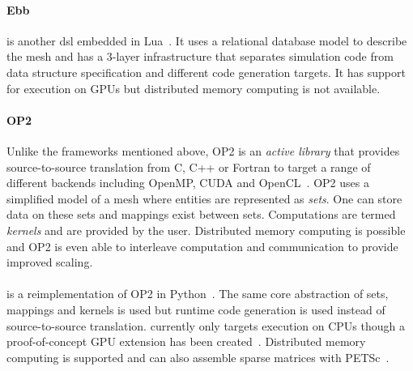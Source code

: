 \documentclass[thesis]{subfiles}
\begin{document}
\paragraph{Ebb}{
  is another \gls{dsl} embedded in Lua~\cite{bernsteinEbbDSLPhysical2016}.
  It uses a relational database model to describe the mesh and has a 3-layer infrastructure that separates simulation code from data structure specification and different code generation targets.
  It has support for execution on GPUs but distributed memory computing is not available.
}

\paragraph{OP2}{
  Unlike the frameworks mentioned above, OP2 is an \textit{active library} that provides source-to-source translation from C, C++ or Fortran to target a range of different backends including OpenMP, CUDA and OpenCL~\cite{mudaligeOP2ActiveLibrary2012}.
  OP2 uses a simplified model of a mesh where entities are represented as \textit{sets}.
  One can store data on these sets and mappings exist between sets.
  Computations are termed \textit{kernels} and are provided by the user.
  Distributed memory computing is possible and OP2 is even able to interleave computation and communication to provide improved scaling.
}

\paragraph{}{
  is a reimplementation of OP2 in Python~\cite{rathgeberPyOP2HighLevelFramework2012}.
  The same core abstraction of sets, mappings and kernels is used but runtime code generation is used instead of source-to-source translation.
   currently only targets execution on CPUs though a proof-of-concept GPU extension has been created~\cite{fenics2021-kulkarni}.
  Distributed memory computing is supported and  can also assemble sparse matrices with PETSc~\cite{petsc-web-page,petsc-user-ref,petsc-efficient}.
}
\end{document}
